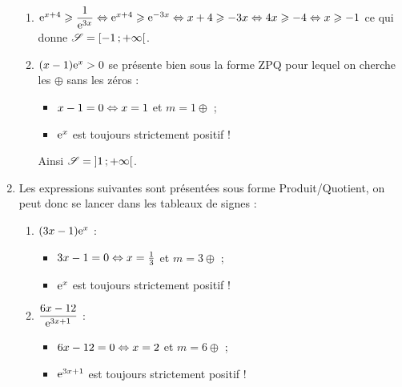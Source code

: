 \documentclass[a4paper,11pt]{article}
\begin{document}
\begin{enumerate}
\begin{enumerate}
		\item $\e^{x+4} \pg \dfrac{1}{\e^{3x}} \ssi \e^{x+4} \pg \e^{-3x} \ssi x+4 \pg -3x \ssi 4x \pg -4 \ssi x \pg -1$ ce qui donne $\mathscr{S}=\intervFO{-1}{+\infty}$.
		\item $(x-1)\e^x  > 0$ se présente bien sous la forme \textsf{ZPQ} pour lequel on cherche \og les $\oplus$ sans les zéros \fg{} :
		\begin{itemize}
			\item $x-1=0 \ssi x=1$ et $m=1 \oplus$ ;
			\item $\e^x$ est toujours strictement positif !
		\end{itemize}
		\begin{center}
		\end{center}
		Ainsi $\mathscr{S}=\intervOO{1}{+\infty}$.
	\end{enumerate}
	\item Les expressions suivantes sont présentées sous forme \textsf{Produit/Quotient}, on peut donc se lancer dans les tableaux de signes :
	\begin{enumerate}
		\item $(3x-1)\e^x$ :
		\begin{itemize}
			\item $3x-1=0 \ssi x=\tfrac13$ et $m=3 \oplus$ ;
			\item $\e^x$ est toujours strictement positif !
		\end{itemize}
		\begin{center}
		\end{center}
		\item $\dfrac{6x-12}{\e^{3x+1}}$ :
		\begin{itemize}
			\item $6x-12=0 \ssi x=2$ et $m=6 \oplus$ ;
			\item $\e^{3x+1}$ est toujours strictement positif !
		\end{itemize}
		\begin{center}
			\begin{tikzpicture}

\end{tikzpicture}
\end{center}
\end{enumerate}
\end{enumerate}
\end{document}
